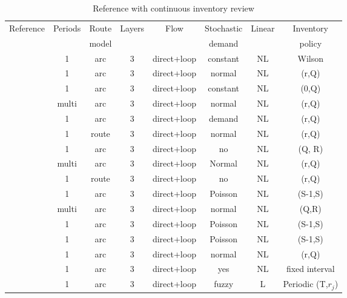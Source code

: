 \documentclass[a4paper,10pt]{article}
\begin{document}
\begin{linenumbers}
\begin{table}[htbp]
	\label{tab:synthese1}
	\scriptsize
\begin{tabular}{lccccccc}
	\toprule
	Reference & Periods & Route & Layers   & Flow &  Stochastic & Linear & Inventory \\
             &          & model & 		   & 	   &     demand        &        & policy                 \\
 \midrule
\cite{Yuchi2016}	&	1	&	arc	&	3 &	direct+loop	&	constant	&	NL	&	Wilson	\\	
\cite{AhmadiJavid2010}	&	1	&	arc  &	3 &	direct+loop	&	normal	&	NL	&	(r,Q) 	\\	
\cite{AhmSed2012}	&	1	&	arc &	3 	&	direct+loop	&	constant 	&	NL	&	(0,Q)	\\	
\cite{Nekooghadirli2014}	&	multi	&	arc &	3 	&	direct+loop	&	normal 	&	NL	&	(r,Q) 	\\	
\cite{Seyedhosseini2014} &	1	&	arc	&3 &	direct+loop	&	demand	&	NL	&	(r,Q) 	\\	
\cite{LiuChenLiLiu2015}	&	1	&	route	&	3 	&	direct+loop	&	normal	&	NL	&	(r,Q) 	\\	
\cite{Tang2016}	&	1	&	arc	&	3 	&	direct+loop	&	no	&	NL	&	(Q, R)	\\	
\cite{Zhalechian2016}	&	multi	&	arc	&	3 	&	direct+loop	&	Normal	&	NL	&	(r,Q) 	\\	
\cite{Deng2016} & 1	&	route	&	3 	&	direct+loop	&	no	&	NL	&	(r,Q) 	\\	
\cite{Dehghani2017}	&	1	&	arc	&	3 	&	direct+loop	&	Poisson	&	NL	&	(S-1,S)	\\	
\cite{Rafie-Majd2018}	&multi	&	arc	&	3 	&	direct+loop	&	normal	&	NL	&	(Q,R)	\\	
\cite{HabibiAS2018}		&	1	&	arc	&	3 &	direct+loop	&	 Poisson 	&	NL	&	(S-1,S)	\\	
\cite{Asadi2018}		&	1	&	arc	&	3 	&	direct+loop	&	Poisson 	&	NL	&	(S-1,S)	\\	
\cite{Saragih2018}	&	1	&	arc	&	3 	&	direct+loop	&	 normal	&	NL	&	(r,Q) 	\\	
\cite{Sajjadi2011}	&	1	&	arc  	&	3	&	direct+loop	&	yes	&	NL	&	fixed interval \\	
\cite{ChenChenSunLiu2014}	&	1	&	arc	&	3 	&	direct+loop	&	fuzzy 	&	L	&	Periodic (T,$r_j$)	\\	
\bottomrule
\end{tabular}
\caption{Reference with continuous inventory review}
\end{table}


\end{linenumbers}
\end{document}
